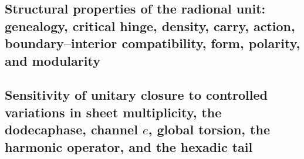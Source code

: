 \subsection{Structural properties of the radional unit: genealogy, critical hinge, density, carry, action, boundary--interior compatibility, form, polarity, and modularity}

\subsection{Sensitivity of unitary closure to controlled variations in sheet multiplicity, the dodecaphase, channel \(e\), global torsion, the harmonic operator, and the hexadic tail}

